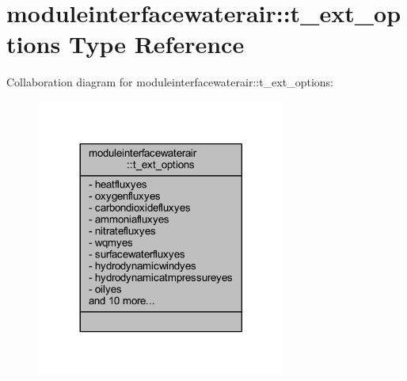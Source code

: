 \hypertarget{structmoduleinterfacewaterair_1_1t__ext__options}{}\section{moduleinterfacewaterair\+:\+:t\+\_\+ext\+\_\+options Type Reference}
\label{structmoduleinterfacewaterair_1_1t__ext__options}


Collaboration diagram for moduleinterfacewaterair\+:\+:t\+\_\+ext\+\_\+options\+:\nopagebreak
\begin{figure}[H]
\begin{center}
\leavevmode
\includegraphics[width=233pt]{structmoduleinterfacewaterair_1_1t__ext__options__coll__graph}
\end{center}
\end{figure}
